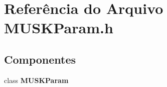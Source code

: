 \section{Referência do Arquivo M\+U\+S\+K\+Param.\+h}
\label{_m_u_s_k_param_8h}
\subsection*{Componentes}
\begin{DoxyCompactItemize}
\item 
class {\bf M\+U\+S\+K\+Param}
\end{DoxyCompactItemize}
